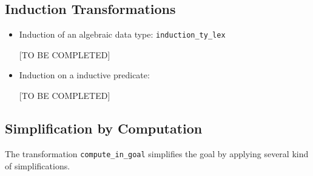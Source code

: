 \subsection{Induction Transformations}

\begin{itemize}
\item Induction of an algebraic data type: \verb|induction_ty_lex|

[TO BE COMPLETED]

\item Induction on a inductive predicate:

[TO BE COMPLETED]

\end{itemize}

\subsection{Simplification by Computation}

The transformation \verb|compute_in_goal| simplifies the goal by applying several kind of simplifications.


